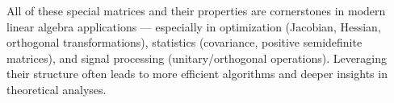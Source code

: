\begin{itemize}
\medskip

\noindent
All of these special matrices and their properties are cornerstones in modern linear algebra applications 
--- especially in optimization (Jacobian, Hessian, orthogonal transformations), statistics (covariance, 
positive semidefinite matrices), and signal processing (unitary/orthogonal operations). 
Leveraging their structure often leads to more efficient algorithms and deeper insights 
in theoretical analyses.


\end{itemize}